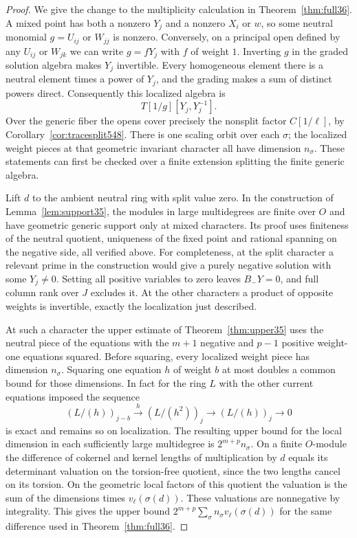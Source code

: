 \documentclass[a4paper,11pt]{article}
\theoremstyle{definition}
\theoremstyle{remark}
\numberwithin{equation}{section}
\begin{document}
\begin{proof}
We give the change to the multiplicity calculation in
Theorem~\ref{thm:full36}. A mixed point has both a nonzero
\(Y_j\) and a nonzero \(X_i\) or \(w\), so some neutral monomial
\(g=U_{ij}\) or \(W_{jj}\) is nonzero. Conversely, on a principal
open defined by any \(U_{ij}\) or \(W_{jk}\) we can write
\(g=fY_j\) with \(f\) of weight \(1\). Inverting \(g\) in the
graded solution algebra makes \(Y_j\) invertible. Every homogeneous
element there is a neutral element times a power of \(Y_j\), and
the grading makes a sum of distinct powers direct. Consequently
this localized algebra is
\[
                       T[1/g][Y_j,Y_j^{-1}].
\]
Over the generic fiber the opens cover precisely the nonsplit
factor \(C[1/\ell]\), by Corollary~\ref{cor:tracesplit548}.
There is one scaling orbit over each \(\sigma\); the localized
weight pieces at that geometric invariant character all have
dimension \(n_\sigma\). These statements can first be checked
over a finite extension splitting the finite generic algebra.

Lift \(d\) to the ambient neutral ring with split value zero.
In the construction of Lemma~\ref{lem:support35}, the modules
in large multidegrees are finite over \(O\) and have geometric
generic support only at mixed characters. Its proof uses
finiteness of the neutral quotient, uniqueness of the fixed
point and rational spanning on the negative side, all verified
above. For completeness, at the split character a relevant
prime in the construction would give a purely negative
solution with some \(Y_j\ne0\). Setting all positive variables
to zero leaves \(B_-Y=0\), and full column rank over \(J\)
excludes it. At the other characters a product of opposite
weights is invertible, exactly the localization just described.

At such a character the upper estimate of
Theorem~\ref{thm:upper35} uses the neutral piece of the equations
with the \(m+1\) negative and \(p-1\) positive weight-one
equations squared. Before squaring, every localized weight piece
has dimension \(n_\sigma\). Squaring one equation \(h\) of
weight \(b\) at most doubles a common bound for those dimensions.
In fact for the ring \(L\) with the other current equations imposed
the sequence
\[
 (L/(h))_{j-b}\xrightarrow{\ h\ }(L/(h^2))_j
                    \longrightarrow (L/(h))_j\longrightarrow0
\]
is exact and remains so on localization. The resulting upper
bound for the local dimension in each sufficiently large
multidegree is \(2^{m+p} n_\sigma\). On a finite \(O\)-module
the difference of cokernel and kernel lengths of multiplication
by \(d\) equals its determinant valuation on the torsion-free
quotient, since the two lengths cancel on its torsion. On the
geometric local factors of this quotient the valuation is the
sum of the dimensions times \(v_\ell(\sigma(d))\). These
valuations are nonnegative by integrality. This gives the upper
bound \(2^{m+p}\sum_\sigma n_\sigma v_\ell(\sigma(d))\) for the
same difference used in Theorem~\ref{thm:full36}.


\end{proof}
\end{document}

